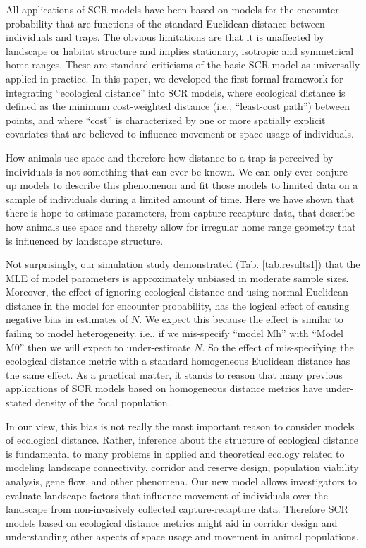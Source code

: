\documentclass[12pt]{article}
\begin{document}
\begin{spacing}{1.8}
All applications of SCR models have been based on models for the
encounter probability that are functions of the standard Euclidean
distance between individuals and traps. The obvious limitations are
that it is unaffected by landscape or habitat structure and implies
stationary, isotropic and symmetrical home ranges. These are standard
criticisms of the basic SCR model as universally applied in practice.
In this paper, we developed the first formal framework for integrating
``ecological distance'' into SCR models, where ecological distance is
defined as the minimum cost-weighted distance (i.e., ``least-cost
path'') between points, and where ``cost'' is characterized by one or
more spatially explicit covariates that are believed to influence
movement or space-usage of individuals.

How animals use space and therefore how distance to a trap is
perceived by individuals is not something that can ever be known. We
can only ever conjure up models to describe this phenomenon and fit
those models to limited data on a sample of individuals during a
limited amount of time.  Here we have shown that there is hope to
estimate parameters, from capture-recapture data, that describe how
animals use space and thereby allow for irregular home range geometry
that is influenced by landscape structure.

Not surprisingly, our simulation study demonstrated
(Tab. \ref{tab.results1}) that the MLE of model parameters is
approximately unbiased in moderate sample sizes. Moreover, the effect
of ignoring ecological distance and using normal Euclidean distance in
the model for encounter probability, has the logical effect of causing
negative bias in estimates of $N$.  We expect this because the effect
is similar to failing to model heterogeneity. i.e., if we mis-specify
``model Mh'' \citep{otis_etal:1978} with ``Model M0''
\citep{otis_etal:1978} then we will expect to under-estimate $N$. So
the effect of mis-specifying the ecological distance metric with a
standard homogeneous Euclidean distance has the same effect. As a
practical matter, it stands to reason that many previous applications
of SCR models based on homogeneous distance metrics have under-stated
density of the focal population.

In our view, this bias is not really the most important reason to
consider models of ecological distance. Rather, inference about the
structure of ecological distance is fundamental to many problems in
applied and theoretical ecology related to modeling landscape
connectivity, corridor and reserve design, population viability
analysis, gene flow, and other phenomena.  Our new model allows
investigators to evaluate landscape factors that influence movement of
individuals over the landscape from non-invasively collected
capture-recapture data.  Therefore SCR models based on ecological
distance metrics might aid in corridor design and understanding other
aspects of space usage and movement in animal populations.


\end{spacing}
\end{document}
